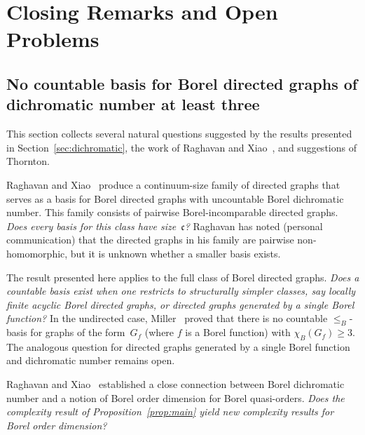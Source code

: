 \chapter{Closing Remarks and Open Problems}\label{ch:closing}

\section{No countable basis for Borel directed graphs of dichromatic number at least three}\label{sec:dichrom-questions}
 
This section collects several natural questions suggested by the results presented in Section~\ref{sec:dichromatic}, the work of Raghavan and Xiao~\cite{RaghavanXiao2024}, and suggestions of Thornton.
 
\begin{question}
	Raghavan and Xiao~\cite{RaghavanXiao2024} produce a continuum-size family of directed graphs that serves as a basis for Borel directed graphs with uncountable Borel dichromatic number.
	This family consists of pairwise Borel-incomparable directed graphs.
	\emph{Does every basis for this class have size~$\mathfrak{c}$?}
	Raghavan has noted (personal communication) that the directed graphs in his family are pairwise non-homomorphic, but it is unknown whether a smaller basis exists.
\end{question}

\begin{question}
	The result presented here applies to the full class of Borel directed graphs.
	\emph{Does a countable basis exist when one restricts to structurally simpler classes, say locally finite acyclic Borel directed graphs, or directed graphs generated by a single Borel function?}
	In the undirected case, Miller~\cite{Miller_2008_MeasurableChromaticNumbers} proved that there is no countable $\leq_B$-basis for graphs of the form~$G_f$ (where $f$ is a Borel function) with $\chi_B(G_f)\geq 3$.
	The analogous question for directed graphs generated by a single Borel function and dichromatic number remains open.
\end{question}	

\begin{question}
	Raghavan and Xiao~\cite{RaghavanXiao2024} established a close connection between Borel dichromatic number and a notion of Borel order dimension for Borel quasi-orders.
	\emph{Does the complexity result of Proposition~\ref{prop:main} yield new complexity results for Borel order dimension?}
\end{question}

